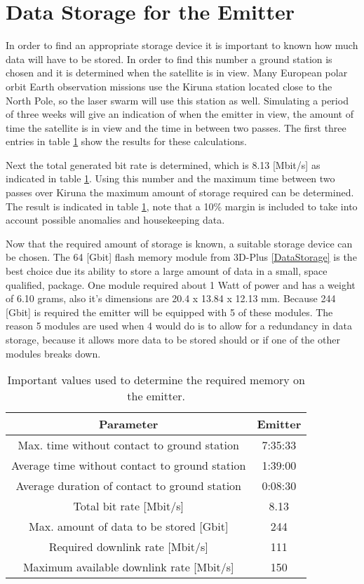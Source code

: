 \section{Data Storage for the Emitter}
\label{DSEmitter}

In order to find an appropriate storage device it is important to known how much data will have to be stored. In order to find this number a ground station is chosen and it is determined when the satellite is in view. Many European polar orbit Earth observation missions use the Kiruna station located close to the North Pole, so the laser swarm will use this station as well. Simulating a period of three weeks will give an indication of when the emitter in view, the amount of time the satellite is in view and the time in between two passes. The first three entries in table \ref{DSEmitterTable} show the results for these calculations.

Next the total generated bit rate is determined, which is 8.13 [Mbit/s] as indicated in table \ref{DSEmitterTable}. Using this number and the maximum time between two passes over Kiruna the maximum amount of storage required can be determined. The result is indicated in table \ref{DSEmitterTable}, note that a 10\% margin is included to take into account possible anomalies and housekeeping data. 

Now that the required amount of storage is known, a suitable storage device can be chosen. The 64 [Gbit] flash memory module from 3D-Plus \ref{DataStorage} is the best choice due its ability to store a large amount of data in a small, space qualified, package. One module required about 1 Watt of power and has a weight of 6.10 grams, also it's dimensions are 20.4 x 13.84 x 12.13 mm. Because 244 [Gbit] is required the emitter will be equipped with 5 of these modules. The reason 5 modules are used when 4 would do is to allow for a redundancy in data storage, because it allows more data to be stored should or if one of the other modules breaks down.

\begin{table}
\centering
\begin{tabular}{c|c}
\textbf{Parameter}  & \textbf{Emitter} \\\hline\hline
	Max. time without contact to ground station & 7:35:33 \\
	Average time without contact to ground station & 1:39:00  \\
	Average duration of contact to ground station & 0:08:30 \\
	Total bit rate [Mbit/s] & 8.13 \\
	Max. amount of data to be stored [Gbit] & 244 \\
	Required downlink rate [Mbit/s] & 111 \\
	Maximum available downlink rate [Mbit/s] & 150 \\
\end{tabular}
\caption{Important values used to determine the required memory on the emitter.}
\label{DSEmitterTable}
\end{table}

